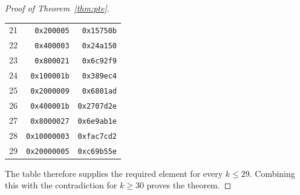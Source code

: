 \begin{proof}[Proof of Theorem~\ref{thm:pte}]
\begin{center}
\begin{tabular}{rrr}
21 & \texttt{0x200005} & \texttt{0x15750b}\\
22 & \texttt{0x400003} & \texttt{0x24a150}\\
23 & \texttt{0x800021} & \texttt{0x6c92f9}\\
24 & \texttt{0x100001b} & \texttt{0x389ec4}\\
25 & \texttt{0x2000009} & \texttt{0x6801ad}\\
26 & \texttt{0x400001b} & \texttt{0x2707d2e}\\
27 & \texttt{0x8000027} & \texttt{0x6e9ab1e}\\
28 & \texttt{0x10000003} & \texttt{0xfac7cd2}\\
29 & \texttt{0x20000005} & \texttt{0xc69b55e}\\
\end{tabular}
\end{center}
The table therefore supplies the required element for every $k\le29$.
Combining this with the contradiction for $k\ge30$ proves the theorem.
\end{proof}
